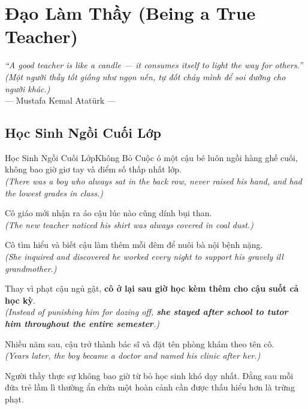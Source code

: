 \chapter{Đạo Làm Thầy (Being a True Teacher)}

\begin{center}
  \textit{\color{truyenblue}``A good teacher is like a candle --- it consumes itself to light the way for others.''}\\
  \textit{(Một người thầy tốt giống như ngọn nến, tự đốt cháy mình để soi đường cho người khác.)}\\[4pt]
  \small\color{truyengold}--- Mustafa Kemal Atatürk ---
\end{center}
\ngancach

\section{Học Sinh Ngồi Cuối Lớp}
\begin{truyen}{Học Sinh Ngồi Cuối Lớp}{Không Bỏ Cuộc}
ó một cậu bé luôn ngồi hàng ghế cuối, không bao giờ giơ tay và điểm số thấp nhất lớp.\\
\textit{(There was a boy who always sat in the back row, never raised his hand, and had the lowest grades in class.)}

Cô giáo mới nhận ra áo cậu lúc nào cũng dính bụi than.\\
\textit{(The new teacher noticed his shirt was always covered in coal dust.)}

Cô tìm hiểu và biết cậu làm thêm mỗi đêm để nuôi bà nội bệnh nặng.\\
\textit{(She inquired and discovered he worked every night to support his gravely ill grandmother.)}

Thay vì phạt cậu ngủ gật, \textbf{cô ở lại sau giờ học kèm thêm cho cậu suốt cả học kỳ}.\\
\textit{(Instead of punishing him for dozing off, \textbf{she stayed after school to tutor him throughout the entire semester}.)}

Nhiều năm sau, cậu trở thành bác sĩ và đặt tên phòng khám theo tên cô.\\
\textit{(Years later, the boy became a doctor and named his clinic after her.)}
\end{truyen}
\begin{baihoc}
  Người thầy thực sự không bao giờ từ bỏ học sinh khó dạy nhất. Đằng sau mỗi đứa trẻ lầm lì thường ẩn chứa một hoàn cảnh cần được thấu hiểu hơn là trừng phạt.
\end{baihoc}

